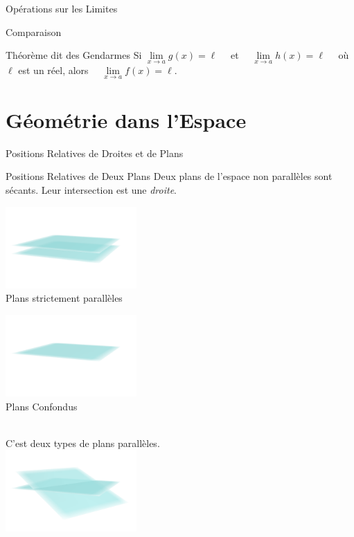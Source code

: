 \documentclass{coursbook}
\begin{document}
\begin{Gpartie}{Opérations sur les Limites}
\begin{Spartie}{Comparaison}
\begin{SSpartie}{Théorème dit \og des Gendarmes \fg{}}
                Si $\lim\limits_{x\to a}g(x)=\ell\quad$ et $\quad\lim\limits_{x\to a}h(x)=\ell\quad$ où $\ell$ est un réel, alors $\quad\lim\limits_{x\to a}f(x)=\ell$.
            \end{SSpartie}
        \end{Spartie}
    \end{Gpartie}



    \chapter{Géométrie dans l'Espace}

    \begin{Gpartie}{Positions Relatives de Droites et de Plans} 
        \begin{Spartie}{Positions Relatives de Deux Plans} 
            Deux plans de l'espace non parallèles sont sécants. Leur intersection est une \emph{droite}.
            \vfill
            \begin{center}
                    \begin{minipage}{5cm}\includegraphics[width=5cm]{rsc/11fig1a.png}\\ \centering Plans strictement parallèles\end{minipage}
                    \begin{minipage}{5cm}\includegraphics[width=5cm]{rsc/11fig1b.png}\\ \centering Plans Confondus\phantom{p}\end{minipage} \\[2ex] %
                    C'est deux types de plans parallèles. \\
                    \includegraphics[width=5cm]{rsc/11fig1c.png} \\

\end{center}
\end{Spartie}
\end{Gpartie}
\end{document}
